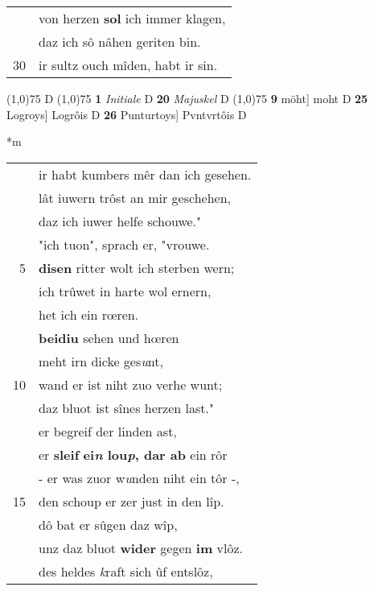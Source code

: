 \documentclass[8pt,a4paper,notitlepage]{article}
\begin{document}
\begin{table}[ht]
\begin{minipage}[t]{0.5\linewidth}
\begin{tabular}{rl}
 & von herzen \textbf{sol} ich immer klagen,\\ 
 & daz ich sô nâhen geriten bin.\\ 
30 & ir sultz ouch mîden, habt ir sin.\\ 
\end{tabular}
\scriptsize
\line(1,0){75} \newline
D \newline
\line(1,0){75} \newline
\textbf{1} \textit{Initiale} D  \textbf{20} \textit{Majuskel} D  \newline
\line(1,0){75} \newline
\textbf{9} möht] moht D \textbf{25} Logroys] Logrôis D \textbf{26} Punturtoys] Pvntvrtôis D \newline
\end{minipage}
\hspace{0.5cm}
\begin{minipage}[t]{0.5\linewidth}
\small
\begin{center}*m
\end{center}
\begin{tabular}{rl}
 & ir habt kumbers mêr dan ich gesehen.\\ 
 & lât iuwern trôst an mir geschehen,\\ 
 & daz ich iuwer helfe schouwe."\\ 
 & "ich tuon", sprach er, "vrouwe.\\ 
5 & \textbf{disen} ritter wolt ich sterben wern;\\ 
 & ich trûwet in harte wol ernern,\\ 
 & het ich ein rœren.\\ 
 & \textbf{beidiu} sehen und hœren\\ 
 & meht irn dicke ges\textit{u}nt,\\ 
10 & wand er ist niht zuo verhe wunt;\\ 
 & daz bluot ist sînes herzen last."\\ 
 & er begreif der linden ast,\\ 
 & er \textbf{sleif} \textbf{ei\textit{n} lou\textit{p}, dar ab} ein rôr\\ 
 & - er was zuor w\textit{u}nden niht ein tôr -,\\ 
15 & den schoup er zer just in den lîp.\\ 
 & dô bat er sûgen daz wîp,\\ 
 & unz daz bluot \textbf{wider} gegen \textbf{im} vlôz.\\ 
 & des heldes \textit{k}raft sich ûf entslôz,\\ 

\end{tabular}
\end{minipage}
\end{table}
\end{document}
